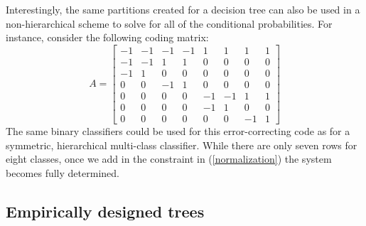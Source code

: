 Interestingly, the same partitions created for a decision tree can also
be used in a non-hierarchical scheme
to solve for all of the conditional probabilities. 
For instance, consider the following coding matrix:
\begin{equation}
A = 
\begin{bmatrix}
-1 & -1 & -1 & -1 & 1 & 1 & 1 & 1 \\
-1 & -1 & 1 & 1 & 0 & 0 & 0 & 0 \\
-1 & 1 & 0 & 0 & 0 & 0 & 0 & 0 \\
0 & 0 & -1 & 1 & 0 & 0 & 0 & 0 \\
0 & 0 & 0 & 0 & -1 & -1 & 1 & 1 \\
0 & 0 & 0 & 0 & -1 & 1 & 0 & 0 \\
0 & 0 & 0 & 0 & 0 & 0 & -1 & 1
\end{bmatrix}
	\label{hierarchical_code}
\end{equation}
The same binary classifiers could be used for this error-correcting code
as for a symmetric, hierarchical multi-class classifier.
While there are only seven rows for eight classes, 
once we add in the constraint in (\ref{normalization}) the system becomes 
fully determined.

\subsection{Empirically designed trees}

\label{empirical}

